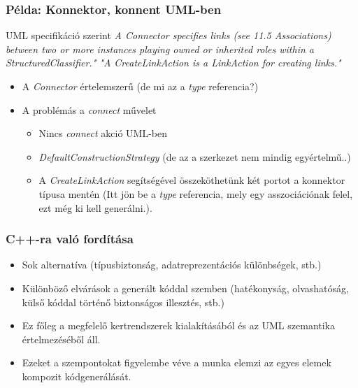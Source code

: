 \documentclass[11pt]{beamer}
\begin{document}
\begin{frame}

	\frametitle{Példa: Konnektor, konnent UML-ben}
	\begin{block}{UML specifikáció szerint}
	\textit{A Connector specifies links (see 11.5 Associations) between two or more instances playing owned or inherited roles within a StructuredClassifier." "A CreateLinkAction is a LinkAction for creating links."}
	\end{block}
	\begin{itemize}
	\item A \textit{Connector} értelemszerű (de mi az a \textit{type} referencia?)
	\item A problémás a \textit{connect} művelet
		\begin{itemize}
		\item Nincs \textit{connect} akció UML-ben
		\item \textit{DefaultConstructionStrategy}  (de az a szerkezet nem mindig egyértelmű..)
		\item A \textit{CreateLinkAction} segítségével összeköthetünk két portot a konnektor típusa mentén (Itt jön be a \textit{type} referencia, mely egy asszociációnak felel, ezt még ki kell generálni.).
		\end{itemize}
	\end{itemize}
\end{frame}


\begin{frame}[fragile]	
	\frametitle{C++-ra való fordítása}	
	\begin{itemize}
	\item Sok alternatíva (típusbiztonság, adatreprezentációs különbségek, stb.)
	\item Különböző elvárások a generált kóddal szemben (hatékonyság, olvashatóság, külső kóddal történő biztonságos illesztés, stb.)
	\item Ez főleg a megfelelő kertrendszerek kialakításából és az UML szemantika értelmezéséből áll.
	\item Ezeket a szempontokat figyelembe véve a munka elemzi az egyes elemek kompozit kódgenerálását.
	\end{itemize}
	
\end{frame}
\end{document}
